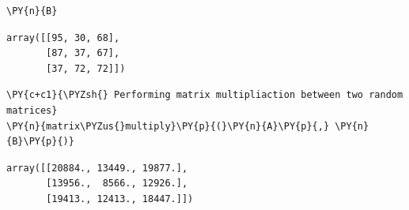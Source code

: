     \begin{tcolorbox}[breakable, size=fbox, boxrule=1pt, pad at break*=1mm,colback=cellbackground, colframe=cellborder]
\begin{Verbatim}[commandchars=\\\{\}]
\PY{n}{B}
\end{Verbatim}
\end{tcolorbox}

            \begin{tcolorbox}[breakable, size=fbox, boxrule=.5pt, pad at break*=1mm, opacityfill=0]
\begin{Verbatim}[commandchars=\\\{\}]
array([[95, 30, 68],
       [87, 37, 67],
       [37, 72, 72]])
\end{Verbatim}
\end{tcolorbox}
        
    \begin{tcolorbox}[breakable, size=fbox, boxrule=1pt, pad at break*=1mm,colback=cellbackground, colframe=cellborder]
\begin{Verbatim}[commandchars=\\\{\}]
\PY{c+c1}{\PYZsh{} Performing matrix multipliaction between two random matrices}
\PY{n}{matrix\PYZus{}multiply}\PY{p}{(}\PY{n}{A}\PY{p}{,} \PY{n}{B}\PY{p}{)}
\end{Verbatim}
\end{tcolorbox}

            \begin{tcolorbox}[breakable, size=fbox, boxrule=.5pt, pad at break*=1mm, opacityfill=0]
\begin{Verbatim}[commandchars=\\\{\}]
array([[20884., 13449., 19877.],
       [13956.,  8566., 12926.],
       [19413., 12413., 18447.]])
\end{Verbatim}
\end{tcolorbox}
        

    
    
    
